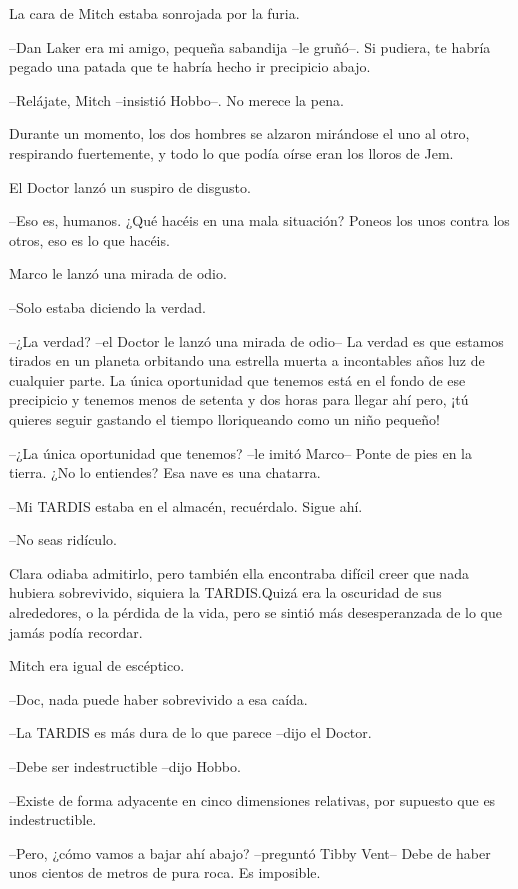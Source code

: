 {La cara de Mitch estaba sonrojada por la furia.}

{--Dan Laker era mi amigo, pequeña sabandija --le gruñó--. Si pudiera, te
habría pegado una patada que te habría hecho ir precipicio abajo.}

{--Relájate, Mitch --insistió Hobbo--. No merece la pena.}

{Durante un momento, los dos hombres se alzaron mirándose el uno al otro,
 respirando fuertemente, y todo lo que podía oírse eran los lloros de
Jem.}

{El Doctor lanzó un suspiro de disgusto.}

{--Eso es, humanos. ¿Qué hacéis en una mala situación? Poneos los unos
contra los otros, eso es lo que hacéis.}

{Marco le lanzó una mirada de odio.}

{--Solo estaba diciendo la verdad.}

{--¿La verdad? --el Doctor le lanzó una mirada de odio-- La verdad es que
 estamos tirados en un planeta orbitando una estrella muerta a
 incontables años luz de cualquier parte. La única oportunidad que
 tenemos está en el fondo de ese precipicio y tenemos menos de setenta y
 dos horas para llegar ahí pero, ¡tú quieres seguir gastando el tiempo
lloriqueando como un niño pequeño!}

{--¿La única oportunidad que tenemos? --le imitó Marco-- Ponte de pies en
la tierra. ¿No lo entiendes? Esa nave es una chatarra.}

{--Mi TARDIS estaba en el almacén, recuérdalo. Sigue ahí.}

{--No seas ridículo.}

{Clara odiaba admitirlo, pero también ella encontraba difícil creer que
 nada hubiera sobrevivido, siquiera la TARDIS.\@ Quizá era la oscuridad de
 sus alrededores, o la pérdida de la vida, pero se sintió más
desesperanzada de lo que jamás podía recordar.}

{Mitch era igual de escéptico.}

{--Doc, nada puede haber sobrevivido a esa caída.}

{--La TARDIS es más dura de lo que parece --dijo el Doctor.}

{--Debe ser indestructible --dijo Hobbo.}

{--Existe de forma adyacente en cinco dimensiones relativas, por supuesto
que es indestructible.}

{--Pero, ¿cómo vamos a bajar ahí abajo? --preguntó Tibby Vent-- Debe de
haber unos cientos de metros de pura roca. Es imposible.}

